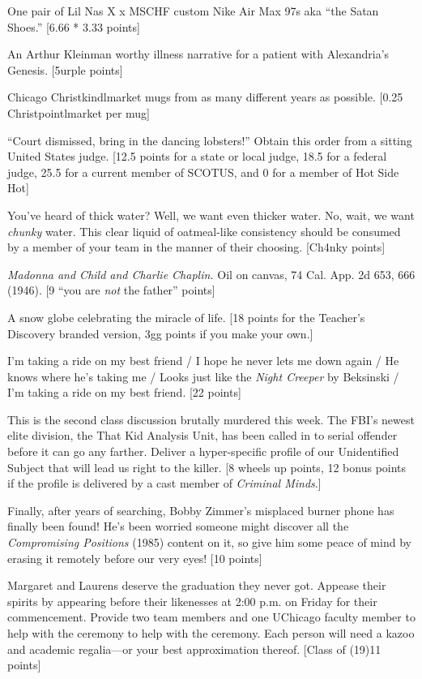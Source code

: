 \documentclass{book}
\begin{document}
\begin{list}{}{}
\item One pair of Lil Nas X x MSCHF custom Nike Air Max 97s aka “the Satan Shoes.” [6.66 * 3.33 points]
\item An Arthur Kleinman worthy illness narrative for a patient with Alexandria’s Genesis. [5urple points] \textleaf
\item Chicago Christkindlmarket mugs from as many different years as possible. [0.25 Christpointlmarket per mug]
\item  “Court dismissed, bring in the dancing lobsters!” Obtain this order from a sitting United States judge. [12.5 points for a state or local judge, 18.5 for a federal judge, 25.5 for a current member of SCOTUS, and 0 for a member of Hot Side Hot]
\item You’ve heard of thick water? Well, we want even thicker water. No, wait, we want \textit{chunky} water. This clear liquid of oatmeal-like consistency should be consumed by a member of your team in the manner of their choosing. [Ch4nky points]
\item \textit{Madonna and Child and Charlie Chaplin.} Oil on canvas, 74 Cal. App. 2d 653, 666 (1946). [9 “you are \textit{not} the father” points]
\item A snow globe celebrating the miracle of life. [18 points for the Teacher’s Discovery branded version, 3gg points if you make your own.]
\item I’m taking a ride on my best friend / I hope he never lets me down again / He knows where he’s taking me / Looks just like the \textit{Night Creeper} by Beksinski / I’m taking a ride on my best friend. [22 points]
\item This is the second class discussion brutally murdered this week. The FBI’s newest elite division, the That Kid Analysis Unit, has been called in to serial offender before it can go any farther. Deliver a hyper-specific profile of our Unidentified Subject that will lead us right to the killer. [8 wheels up points, 12 bonus points if the profile is delivered by a cast member of \textit{Criminal Minds}.]
\item Finally, after years of searching, Bobby Zimmer’s misplaced burner phone has finally been found! He’s been worried someone might discover all the \textit{Compromising Positions} (1985) content on it, so give him some peace of mind by erasing it remotely before our very eyes! [10 points]
\item Margaret and Laurens deserve the graduation they never got. Appease their spirits by appearing before their likenesses at 2:00 p.m. on Friday for their commencement. Provide two team members and one UChicago faculty member to help with the ceremony to help with the ceremony. Each person will need a kazoo and academic regalia---or your best approximation thereof. [Class of (19)11 points]

\end{list}
\end{document}
